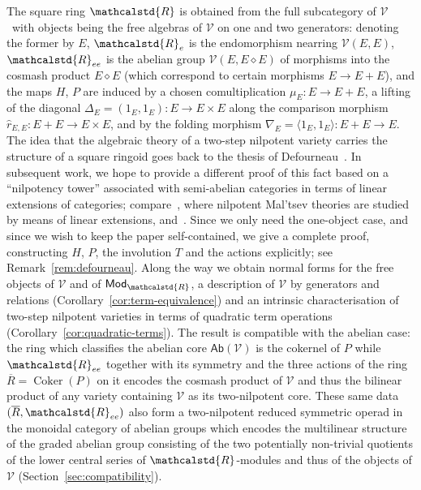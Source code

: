 \documentclass[reqno,a4paper]{amsart}
\theoremstyle{plain}
\theoremstyle{definition}
\newcommand{\V}{\ensuremath{\mathcal{V}}}
\newcommand{\R}{\ensuremath{\mathcalstd{R}}}
\newcommand{\Ab}{\ensuremath{\mathsf{Ab}}}
\newcommand{\Mod}{\ensuremath{\mathsf{Mod}}}
\DeclareMathOperator{\Coker}{Coker}
\newcommand{\cosmash}{\ensuremath{\diamond}}
\newcommand{\cm}[2]{\ensuremath{\hat{r}_{#1,#2}}}          %
\renewcommand{\Re}{\ensuremath{\R_{e}}}
\newcommand{\Ree}{\ensuremath{\R_{ee}}}
\newcommand{\Rbar}{\ensuremath{\overline{R}}}
\begin{document}
The square ring \(\R\) is obtained from the full subcategory of \V\ with objects being the free algebras  of \(\V\) on one and two generators: denoting the former by  \(E\), \(\Re\) is the endomorphism nearring \(\V(E,E)\), \(\Ree\) is the abelian group \(\V(E,E\cosmash E)\) of morphisms into the cosmash product \(E\cosmash E\) (which correspond to certain morphisms \(E\to E+E\)), and the maps \(H\), \(P\) are induced by a chosen comultiplication \(\mu_{E}\colon E\to E+E\), a lifting of the diagonal \(\Delta_E=(1_E,1_E)\colon E\to E\times E\) along the comparison morphism \(\cm{E}{E}\colon E+E\to E\times E\), and by the folding morphism \(\nabla_E=\langle 1_E,1_E\rangle\colon E+E\to E\). The idea that the algebraic theory of a two-step nilpotent variety carries the structure of a square ringoid goes back to the thesis of Defourneau~\cite[Proposition~4.1.24]{Defourneau}. In subsequent work, we hope to provide a different proof of this fact based on a ``nilpotency tower'' associated with semi-abelian categories in terms of linear extensions of categories; compare~\cite{Jibladze-Pirashvili:Linear}, where nilpotent Mal'tsev theories are studied by means of linear extensions, and~\cite{BeBou}. Since we only need the one-object case, and since we wish to keep the paper self-contained, we give a complete proof, constructing \(H\), \(P\), the involution \(T\) and the actions explicitly; see Remark~\ref{rem:defourneau}. Along the way we obtain normal forms for the free objects of \(\V\) and of \(\Mod_{\R}\), a description of \(\V\) by generators and relations (Corollary~\ref{cor:term-equivalence}) and an intrinsic characterisation of two-step nilpotent varieties in terms of quadratic term operations (Corollary~\ref{cor:quadratic-terms}). The result is compatible with the abelian case: the ring which classifies the abelian core \(\Ab(\V)\) is the cokernel of \(P\) while \(\Ree\) together with its symmetry and the three actions of the ring \(\Rbar= \Coker(P)\) on it encodes the cosmash product of \(\V\) and thus the bilinear product \cite{DHVdL} of any variety containing \(\V\) as its two-nilpotent core. These same data \((\Rbar,\Ree)\) also form a two-nilpotent reduced symmetric operad in the monoidal category of abelian groups which encodes the multilinear structure of the graded abelian group consisting of the two potentially non-trivial quotients of the lower central series of \(\R\)-modules and thus of the objects of \(\V\) (Section~\ref{sec:compatibility}).
\end{document}
